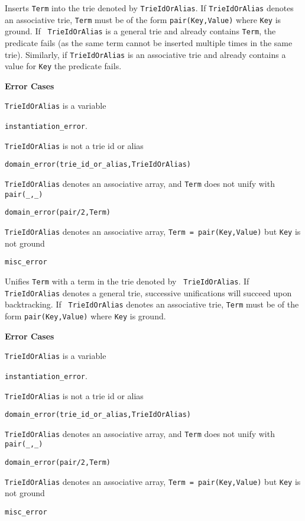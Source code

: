 \begin{description}
%
Inserts {\tt Term} into the trie denoted by {\tt TrieIdOrAlias}.  If
{\tt TrieIdOrAlias} denotes an associative trie, {\tt Term} must be of
the form {\tt pair(Key,Value)} where {\tt Key} is ground.  If {\tt
  TrieIdOrAlias} is a general trie and already contains {\tt Term},
the predicate fails (as the same term cannot be inserted multiple
times in the same trie).  Similarly, if {\tt TrieIdOrAlias} is an
associative trie and already contains a value for {\tt Key} the
predicate fails.

{\bf Error Cases}
\bi
\item 	{\tt TrieIdOrAlias} is a variable
\bi
\item 	{\tt instantiation\_error}.
\ei
\item 	{\tt TrieIdOrAlias} is not a trie id or alias
\bi
\item 	{\tt domain\_error(trie\_id\_or\_alias,TrieIdOrAlias)}
\ei
\item 	{\tt TrieIdOrAlias} denotes an associative array, and {\tt Term} 
  does not unify with {\tt pair(\_,\_)} 
\bi
\item 	{\tt domain\_error(pair/2,Term)}
\ei
\item 	{\tt TrieIdOrAlias} denotes an associative array, 
  {\tt Term = pair(Key,Value)} but {\tt Key} is not ground 
\bi
\item 	{\tt misc\_error}
\ei
\ei
%

%
Unifies {\tt Term} with a term in the trie denoted by {\tt
  TrieIdOrAlias}.  If {\tt TrieIdOrAlias} denotes a general trie,
successive unifications will succeed upon backtracking.  If {\tt
  TrieIdOrAlias} denotes an associative trie, {\tt Term} must be of
the form {\tt pair(Key,Value)} where {\tt Key} is ground.

{\bf Error Cases}
\bi
\item 	{\tt TrieIdOrAlias} is a variable
\bi
\item 	{\tt instantiation\_error}.
\ei
\item 	{\tt TrieIdOrAlias} is not a trie id or alias
\bi
\item 	{\tt domain\_error(trie\_id\_or\_alias,TrieIdOrAlias)}
\ei
\item 	{\tt TrieIdOrAlias} denotes an associative array, and {\tt Term} 
  does not unify with {\tt pair(\_,\_)} 
\bi
\item 	{\tt domain\_error(pair/2,Term)}
\ei
\item {\tt TrieIdOrAlias} denotes an associative array, 
  {\tt Term = pair(Key,Value)} but {\tt Key} is not ground 
\bi
\item 	{\tt misc\_error}
\ei
\ei


\end{description}
